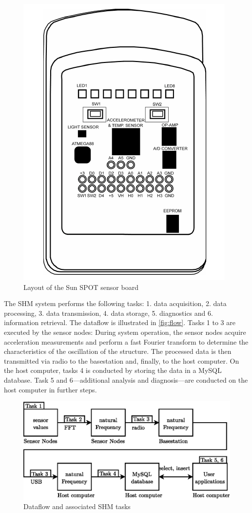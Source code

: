 \documentclass[12pt,a4paper]{scrartcl}
\begin{document}
\begin{figure}[htb]
    \centering
    \includegraphics[scale=0.5]{figures/eDemoboard.png}
    \caption{Layout of the Sun SPOT sensor board \cite{spotToO}}
    \label{fig:SPOT}
\end{figure}

The SHM system performs the following tasks:
1. data acquisition,
2. data processing,
3. data transmission, 
4. data storage,
5. diagnostics and 
6. information retrieval.
The dataflow is illustrated in \autoref{fig:flow}.
Tasks 1 to 3 are executed by the sensor nodes: During system operation, the sensor nodes acquire acceleration measurements and perform a fast Fourier transform to determine the characteristics of the oscillation of the structure. 
The processed data is then transmitted via radio to the basestation and, finally, to the host computer.
On the host computer, tasks 4 is conducted by storing the data in a MySQL database.
Task 5 and 6---additional analysis and diagnosis---are conducted on the host computer in further steps.

\begin{figure}[ht]
    \centering
    \includegraphics{figures/dataflow_tasks.eps}
    \caption{Dataflow and associated SHM tasks}
    \label{fig:flow}
\end{figure}
\end{document}
